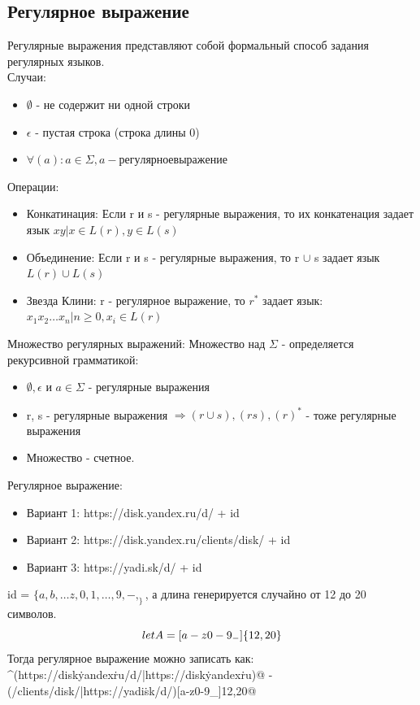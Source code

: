 \documentclass[areasetadvanced]{scrartcl}
\begin{document}
\subsection{Регулярное выражение}
Регулярные выражения представляют собой формальный способ задания регулярных языков. \\
Случаи:
\begin{itemize}
  \item $\emptyset$ - не содержит ни одной строки
  \item $\epsilon$ - пустая строка (строка длины 0)
  \item $\forall (a) : a \in \Sigma, a - регулярное выражение$
\end{itemize}
Операции:
\begin{itemize}
  \item Конкатинация: Если r и s - регулярные выражения, то их конкатенация задает язык ${xy | x \in L(r), y \in L(s)}$
  \item Объединение: Если r и s - регулярные выражения, то r $\cup$ s задает язык $L(r) \cup L(s)$ 
  \item Звезда Клини: r - регулярное выражение, то $r^*$ задает язык: ${x_1x_2\dots x_n | n \geq 0, x_i \in L(r)}$
\end{itemize}
Множество регулярных выражений:
Множество над $\Sigma$ - определяется рекурсивной грамматикой:
\begin{itemize}
  \item $\emptyset, \epsilon$ и $a \in \Sigma$ - регулярные выражения
  \item r, s - регулярные выражения $\Rightarrow (r \cup s), (rs), (r)^*$ - тоже регулярные выражения
  \item Множество - счетное.
\end{itemize}
Регулярное выражение:
\begin{itemize}
  \item Вариант 1: https://disk.yandex.ru/d/ + id
  \item Вариант 2: https://disk.yandex.ru/clients/disk/ + id
  \item Вариант 3: https://yadi.sk/d/ + id
\end{itemize}
id = $\{a,b,\dots z, 0, 1, \dots, 9, -, _\}$, а длина генерируется случайно от 12 до 20 символов.
\[let A = [a-z0-9\\_-]\{12,20\}\]
Тогда регулярное выражение можно записать как: \\
\verb@^(https://disk\.yandex\.ru/d/|https://disk\.yandex\.ru)@ -\\
\verb@(/clients/disk/|https://yadi\.sk/d/)[a-z0-9\-_]{12,20}@
\end{document}
